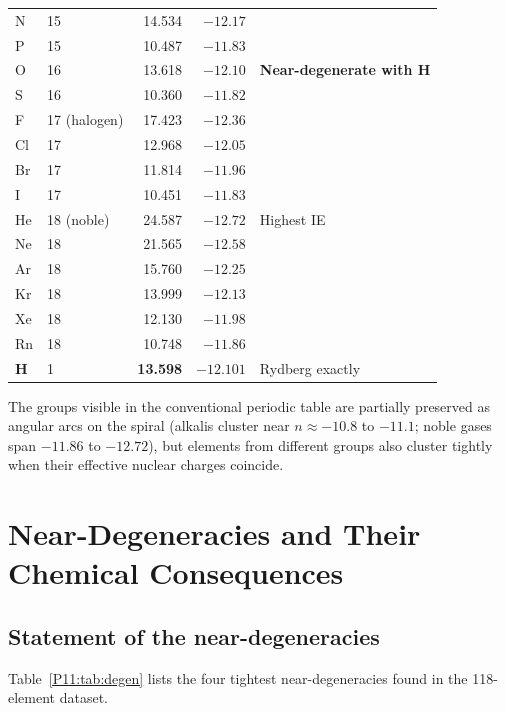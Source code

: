 \documentclass[11pt,a4paper]{article}
\theoremstyle{definition}
\theoremstyle{remark}
\begin{document}
\begin{longtable}{llrrp{5cm}}
\midrule
N   & 15              & 14.534 & $-12.17$ & \\
P   & 15              & 10.487 & $-11.83$ & \\
O   & 16              & 13.618 & $-12.10$ & \textbf{Near-degenerate with H} \\
S   & 16              & 10.360 & $-11.82$ & \\
\midrule
F   & 17 (halogen)    & 17.423 & $-12.36$ & \\
Cl  & 17              & 12.968 & $-12.05$ & \\
Br  & 17              & 11.814 & $-11.96$ & \\
I   & 17              & 10.451 & $-11.83$ & \\
\midrule
He  & 18 (noble)      & 24.587 & $-12.72$ & Highest IE \\
Ne  & 18              & 21.565 & $-12.58$ & \\
Ar  & 18              & 15.760 & $-12.25$ & \\
Kr  & 18              & 13.999 & $-12.13$ & \\
Xe  & 18              & 12.130 & $-11.98$ & \\
Rn  & 18              & 10.748 & $-11.86$ & \\
\midrule
\textbf{H}   & 1      & \textbf{13.598} & $\mathbf{-12.101}$ & Rydberg exactly \\
\end{longtable}

The groups visible in the conventional periodic table
are partially preserved as angular arcs on the spiral
(alkalis cluster near $n \approx -10.8$ to $-11.1$;
noble gases span $-11.86$ to $-12.72$),
but elements from different groups also cluster tightly
when their effective nuclear charges coincide.

\section{Near-Degeneracies and Their Chemical Consequences}
\label{P11:sec:near_deg}

\subsection{Statement of the near-degeneracies}

Table~\ref{P11:tab:degen} lists the four tightest near-degeneracies
found in the 118-element dataset.
\end{document}
